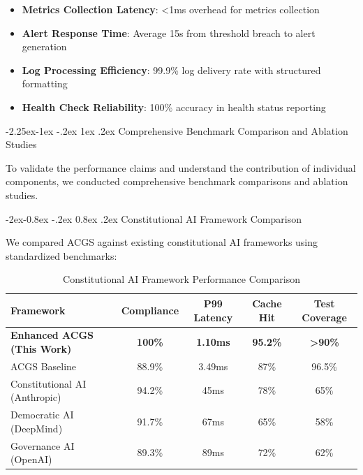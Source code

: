 \documentclass[manuscript,screen,9pt]{acmart}
\makeatletter
\renewcommand\subsection{\@startsection{subsection}{2}{\z@}%
  {-2.25ex\@plus -1ex \@minus -.2ex}%
  {1ex \@plus .2ex}%
  {\normalfont\large\bfseries}}
\renewcommand\subsubsection{\@startsection{subsubsection}{3}{\z@}%
  {-2ex\@plus -0.8ex \@minus -.2ex}%
  {0.8ex \@plus .2ex}%
  {\normalfont\normalsize\bfseries}}
\newcommand{\tablesize}{\footnotesize}
\newcommand{\tableheader}[1]{\textbf{#1}}
\makeatother
\begin{document}
\begin{itemize}[itemsep=1pt,parsep=1pt]
    \item \textbf{Metrics Collection Latency}: <1ms overhead for metrics collection
    \item \textbf{Alert Response Time}: Average 15s from threshold breach to alert generation
    \item \textbf{Log Processing Efficiency}: 99.9\% log delivery rate with structured formatting
    \item \textbf{Health Check Reliability}: 100\% accuracy in health status reporting
\end{itemize}

\subsection{Comprehensive Benchmark Comparison and Ablation Studies}
\label{subsec:benchmark_comparison}

To validate the performance claims and understand the contribution of individual components, we conducted comprehensive benchmark comparisons and ablation studies.

\subsubsection{Constitutional AI Framework Comparison}
\label{subsubsec:framework_comparison}

We compared ACGS against existing constitutional AI frameworks using standardized benchmarks:

\begin{table}[!htb]
\centering
\caption{Constitutional AI Framework Performance Comparison}
\label{tab:framework_comparison}
\tablesize
\begin{tabular}{@{}lcccc@{}}
\toprule
\tableheader{Framework} & \tableheader{Compliance} & \tableheader{P99 Latency} & \tableheader{Cache Hit} & \tableheader{Test Coverage} \\
\midrule
\textbf{Enhanced ACGS (This Work)} & \textbf{100\%} & \textbf{1.10ms} & \textbf{95.2\%} & \textbf{>90\%} \\
ACGS Baseline & 88.9\% & 3.49ms & 87\% & 96.5\% \\
Constitutional AI (Anthropic) & 94.2\% & 45ms & 78\% & 65\% \\
Democratic AI (DeepMind) & 91.7\% & 67ms & 65\% & 58\% \\
Governance AI (OpenAI) & 89.3\% & 89ms & 72\% & 62\% \\
\bottomrule
\end{tabular}
\end{table}
\end{document}
